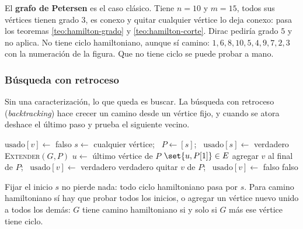 \documentclass[11pt,letterpaper]{article}
\begin{document}
El \textbf{grafo de Petersen} es el caso clásico. Tiene $n = 10$ y
$m = 15$, todos sus vértices tienen grado $3$, es conexo y quitar
cualquier vértice lo deja conexo: pasa los teoremas
\ref{teo:hamilton-grado} y \ref{teo:hamilton-corte}. Dirac pediría
grado $5$ y no aplica. No tiene ciclo hamiltoniano, aunque sí camino:
$1, 6, 8, 10, 5, 4, 9, 7, 2, 3$ con la numeración de la figura. Que
no tiene ciclo se puede probar a mano.


\subsubsection*{Búsqueda con retroceso}

Sin una caracterización, lo que queda es buscar. La búsqueda con
retroceso (\textit{backtracking}) hace crecer un camino desde un
vértice fijo, y cuando se atora deshace el último paso y prueba el
siguiente vecino.

\begin{algorithm}[H]
\caption{\textsc{Ciclo-Hamiltoniano}$(G)$: búsqueda con retroceso}
\label{alg:hamilton-retroceso}
\begin{algorithmic}[1]
    \State $\text{usado}[v] \gets$ falso
  \EndFor
  \State $s \gets$ cualquier vértice; \ $P \gets [s]$; \
         $\text{usado}[s] \gets$ verdadero
  \State \Return \textsc{Extender}$(G, P)$
\EndProcedure
\Statex
{}
  \State $u \gets$ último vértice de $P$
    \State \Return $\set{u, P[1]} \in E$ 
  \EndIf
    \State agregar $v$ al final de $P$; \
           $\text{usado}[v] \gets$ verdadero
    \If{\textsc{Extender}$(G, P)$}
      \State \Return verdadero
    \EndIf
    \State quitar $v$ de $P$; \ $\text{usado}[v] \gets$ falso
  \EndFor
  \State \Return falso
\EndProcedure
\end{algorithmic}
\end{algorithm}

Fijar el inicio $s$ no pierde nada: todo ciclo hamiltoniano pasa por
$s$. Para camino hamiltoniano sí hay que probar todos los inicios, o
agregar un vértice nuevo unido a todos los demás: $G$ tiene camino
hamiltoniano si y solo si $G$ más ese vértice tiene ciclo.
\end{document}

